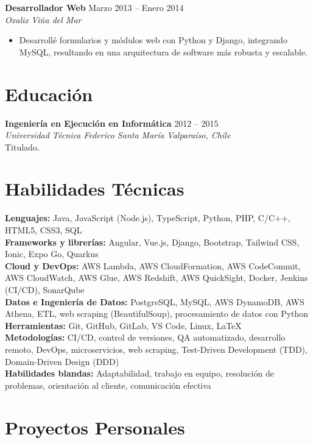 \documentclass[11pt,a4paper]{article}
\newcommand{\job}[4]{%
    \textbf{#1} \hfill #2\\
    \textit{#3} \hfill \textit{#4}\\[2pt]
}
\begin{document}
\job{Desarrollador Web}{Marzo 2013 -- Enero 2014}{Oxalix}{Viña del Mar}
\begin{itemize}[leftmargin=*, itemsep=1pt, topsep=2pt]
    \item Desarrollé formularios y módulos web con Python y Django, integrando MySQL, resultando en una arquitectura de software más robusta y escalable.
\end{itemize}

\section*{Educación}
\textbf{Ingeniería en Ejecución en Informática} \hfill 2012 -- 2015\\
\textit{Universidad Técnica Federico Santa María} \hfill \textit{Valparaíso, Chile}\\
Titulado.

\section*{Habilidades Técnicas}
\textbf{Lenguajes:} Java, JavaScript (Node.js), TypeScript, Python, PHP, C/C++, HTML5, CSS3, SQL\\
\textbf{Frameworks y librerías:} Angular, Vue.js, Django, Bootstrap, Tailwind CSS, Ionic, Expo Go, Quarkus\\
\textbf{Cloud y DevOps:} AWS Lambda, AWS CloudFormation, AWS CodeCommit, AWS CloudWatch, AWS Glue, AWS Redshift, AWS QuickSight, Docker, Jenkins (CI/CD), SonarQube\\
\textbf{Datos e Ingeniería de Datos:} PostgreSQL, MySQL, AWS DynamoDB, AWS Athena, ETL, web scraping (BeautifulSoup), procesamiento de datos con Python\\
\textbf{Herramientas:} Git, GitHub, GitLab, VS Code, Linux, \LaTeX\\
\textbf{Metodologías:} CI/CD, control de versiones, QA automatizado, desarrollo remoto, DevOps, microservicios, web scraping, Test-Driven Development (TDD), Domain-Driven Design (DDD)\\
\textbf{Habilidades blandas:} Adaptabilidad, trabajo en equipo, resolución de problemas, orientación al cliente, comunicación efectiva

\section*{Proyectos Personales}
\end{document}
